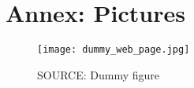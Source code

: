 \documentclass[a4paper, 11pt]{memoir}
\begin{document}
    \section*{Annex: Pictures}

    \begin{figure}
        \texttt{[image: dummy\_web\_page.jpg]}
        \caption{SOURCE: Dummy figure}
    \end{figure}
\end{document}
